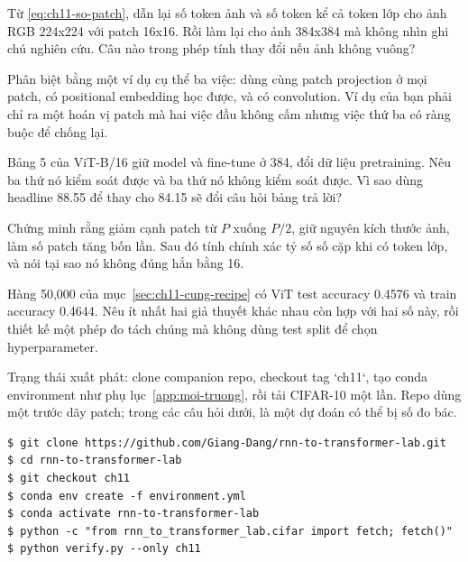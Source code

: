 \exercises

\tierunderstand

\begin{bt}
  \item Từ \eqref{eq:ch11-so-patch}, dẫn lại số token ảnh và số token kể cả
    token lớp cho ảnh RGB 224x224 với patch 16x16. Rồi làm lại cho ảnh 384x384
    mà không nhìn ghi chú nghiên cứu. Câu nào trong phép tính thay đổi nếu ảnh
    không vuông?

  \item Phân biệt bằng một ví dụ cụ thể ba việc: dùng cùng patch projection ở
    mọi patch, có positional embedding học được, và có convolution. Ví dụ của
    bạn phải chỉ ra một hoán vị patch mà hai việc đầu không cấm nhưng việc thứ
    ba có ràng buộc để chống lại.

  \item Bảng 5 của ViT-B/16 giữ model và fine-tune ở 384, đổi dữ liệu
    pretraining. Nêu ba thứ nó kiểm soát được và ba thứ nó không kiểm soát
    được. Vì sao dùng headline 88.55 để thay cho 84.15 sẽ đổi câu hỏi bảng trả
    lời?

  \item Chứng minh rằng giảm cạnh patch từ \(P\) xuống \(P/2\), giữ nguyên
    kích thước ảnh, làm số patch tăng bốn lần. Sau đó tính chính xác tỷ số số
    cặp khi có token lớp, và nói tại sao nó không đúng hẳn bằng 16.

  \item Hàng 50,000 của mục~\ref{sec:ch11-cung-recipe} có ViT test accuracy
    0.4576 và train accuracy 0.4644. Nêu ít nhất hai giả thuyết khác nhau còn
    hợp với hai số này, rồi thiết kế một phép đo tách chúng mà không dùng test
    split để chọn hyperparameter.
\end{bt}

\tierapply

Trạng thái xuất phát: clone companion repo, checkout tag `ch11`, tạo conda
environment như phụ lục~\ref{app:moi-truong}, rồi tải CIFAR-10 một lần. Repo
dùng một  trước dãy patch; trong các câu hỏi dưới,
 là một dự đoán có thể bị số đo bác.

\begin{verbatim}
$ git clone https://github.com/Giang-Dang/rnn-to-transformer-lab.git
$ cd rnn-to-transformer-lab
$ git checkout ch11
$ conda env create -f environment.yml
$ conda activate rnn-to-transformer-lab
$ python -c "from rnn_to_transformer_lab.cifar import fetch; fetch()"
$ python verify.py --only ch11
\end{verbatim}

